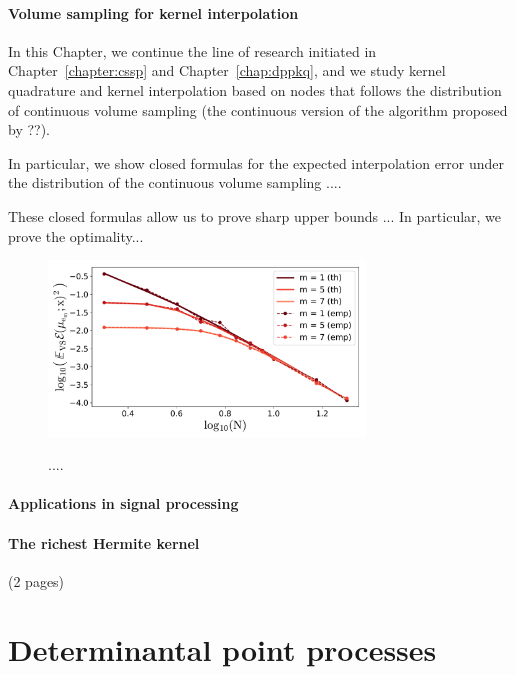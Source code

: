 \documentclass[twoside,11pt]{book}
\numberwithin{theorem}{chapter}
\numberwithin{definition}{chapter}
\numberwithin{proposition}{chapter}
\numberwithin{corollary}{chapter}
\numberwithin{example}{chapter}
\numberwithin{lemma}{chapter}
\numberwithin{assumption}{chapter}
\begin{document}
\subsubsection{Volume sampling for kernel interpolation}
In this Chapter, we continue the line of research initiated in Chapter~\ref{chapter:cssp} and Chapter~\ref{chap:dppkq}, and we study kernel quadrature and kernel interpolation based on nodes that follows the distribution of continuous volume sampling (the continuous version of the algorithm proposed by ??).

In particular, we show closed formulas for the expected interpolation error under the distribution of the continuous volume sampling ....

These closed formulas allow us to prove sharp upper bounds ... In particular, we prove the optimality...



\begin{figure}
\centering
\includegraphics[width=0.75\textwidth]{img/introduction/EX_VS_err_n_s_2_th_vs_emp_exp50.pdf}\\
\caption{....
\label{fig:introduction_VS_th_vs_exp}}
\end{figure}

\subsubsection{Applications in signal processing}
\subsubsection{The richest Hermite kernel}
(2 pages)

\clearpage
\chapter{Determinantal point processes}\label{chapter:dpp}
\end{document}
